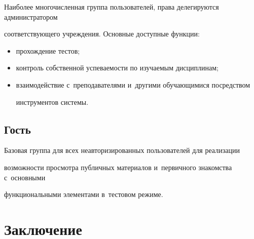 \vspace*{-3pt}





Наиболее многочисленная группа пользователей, права делегируются администратором 


соответствующего учреждения. Основные доступные функции:


\begin{itemize}


\item прохождение тестов;\\[-15pt]


\item контроль собственной успеваемости по изучаемым дисциплинам;\\[-15pt]


\item взаимодействие с~преподавателями и~другими обучающимися посредством 


инструментов системы.


\end{itemize}





\vspace*{-3pt}





\subsection{Гость}





\vspace*{-3pt}





Базовая группа для всех неавторизированных пользователей для реализации 


возможности просмотра публичных материалов и~первичного знакомства с~основными 


функциональными элементами в~тестовом режиме.





\vspace*{-3pt}








\section{Заключение}





